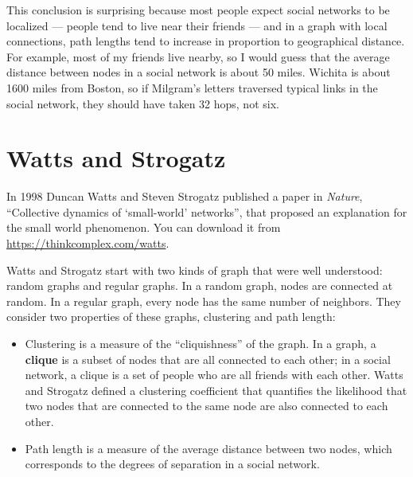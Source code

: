 \documentclass[12pt]{book}
\theoremstyle{exercise}
\begin{document}

This conclusion is surprising because most people expect social
networks to be localized --- people tend to live near their
friends --- and in a graph with local connections, path lengths tend to
increase in proportion to geographical distance.  For example, most of
my friends live nearby, so I would guess that the average distance
between nodes in a social network is about 50 miles.  Wichita is about
1600 miles from Boston, so if Milgram's letters traversed typical
links in the social network, they should have taken 32 hops, not six.



\section{Watts and Strogatz}
\label{watts}

In 1998 Duncan Watts and Steven Strogatz published a paper in {\em
  Nature}, ``Collective dynamics of `small-world' networks'', that
proposed an explanation for the small world phenomenon.  You can
download it from
\url{https://thinkcomplex.com/watts}.


Watts and Strogatz start with two kinds of graph that were well
understood: random graphs and regular graphs.  In a random graph, nodes
are connected at random.  In a regular graph, every node has the
same number of neighbors.
They consider two
properties of these graphs, clustering and path length:


\begin{itemize}

\item Clustering is a measure of the ``cliquishness'' of the graph.
In a graph, a {\bf clique} is a subset of nodes that are
all connected to each other; in a social network, a clique is
a set of people who are all friends with each other.  Watts and Strogatz
defined a clustering coefficient that quantifies the likelihood
that two nodes that are connected to the same node are also
connected to each other.


\item Path length is a measure of the average distance between
two nodes, which corresponds to the degrees of separation in
a social network.

\end{itemize}
\end{document}

